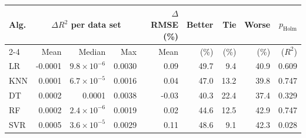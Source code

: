 \begin{tabular}{lrrrrrrrr}
\toprule
\textbf{Alg.} & \multicolumn{3}{c}{\textbf{$\Delta R^2$ per data set}} & \textbf{$\Delta$RMSE (\%)} & \textbf{Better} & \textbf{Tie} & \textbf{Worse} & \textbf{$p_{\text{Holm}}$} \\
\cmidrule(lr){2-4}
& Mean & Median & Max & Mean & (\%) & (\%) & (\%) & ($R^2$) \\
\midrule
LR & -0.0001 & $9.8\times10^{-6}$ & 0.0030 & 0.09 & 49.7 & 9.4 & 40.9 & 0.609 \\
KNN & 0.0001 & $6.7\times10^{-5}$ & 0.0016 & 0.04 & 47.0 & 13.2 & 39.8 & 0.747 \\
DT & 0.0002 & 0.0001 & 0.0038 & -0.03 & 40.3 & 22.4 & 37.4 & 0.329 \\
RF & 0.0002 & $2.4\times10^{-6}$ & 0.0019 & 0.02 & 44.6 & 12.5 & 42.9 & 0.747 \\
SVR & 0.0005 & $3.6\times10^{-5}$ & 0.0029 & 0.11 & 48.6 & 9.1 & 42.3 & 0.028 \\
\bottomrule
\end{tabular}
